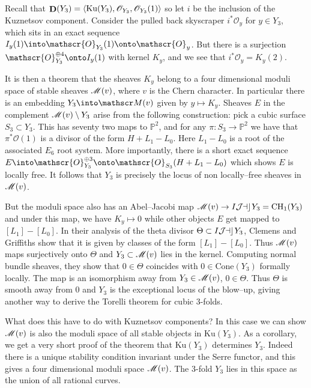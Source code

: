 \begin{example} Recall that \(\mathop{\mathbf{D}}(Y_3)=\langle \text{Ku}(Y_3),
    \mathscr{O}_{Y_3}, \mathscr{O}_{Y_3}(1)\rangle\) so let \(i\) be the
    inclusion of the Kuznetsov component. Consider the pulled back
    skyscraper \(i^\ast\mathscr{O}_y\) for \(y\in Y_3\), which sits in an exact
    sequence \(I_y(1)\into \mathscr{O}_{Y_3}(1)\onto \mathscr{O}_y \). But there
    is a surjection \(\mathscr{O}^{\oplus 4}_{Y_3}\onto
    I_y(1)\) with kernel \(K_y\), and we see that \(i^\ast
    \mathscr{O}_y=K_y(2)\).

    It is then a theorem that the sheaves \(K_y\) belong to a four dimensional
    moduli space of stable sheaves \(\mathscr{M}(v)\), where \(v\) is the Chern
    character. In particular there is an embedding \(Y_3\into \Moduli(v)\)
    given by \(y\mapsto K_y\). Sheaves \(E\) in the complement
    \(\mathscr{M}(v)\setminus Y_3\) arise from the following construction: pick
    a cubic surface \(S_3\subset Y_3\). This has seventy two maps to
    \(\mathbb{P}^2\), and for any \(\pi:S_3\to \mathbb{P}^2\) we have that
    \(\pi^\ast\mathscr{O}(1)\) is a divisor of the form \(H+L_1-L_0\). Here
    \(L_1-L_0\) is a root of the associated \(E_6\) root system. More
    importantly, there is a short exact sequence \(E\into
    \mathscr{O}_{Y_3}^{\oplus 3}\onto \mathscr{O}_{S_3}(H+L_1-L_0)\) which
    shows \(E\) is locally free. It follows that \(Y_3\) is precisely the locus
    of non locally--free sheaves in \(\mathscr{M}(v)\).

    But the moduli space also has an Abel--Jacobi map \(\mathscr{M}(v)\to
    \mathop{I\mathcal{J\kern -0.5pt a\kern -0.5pt c\kern -1pt}} Y_3=\text{CH}_1(Y_3)\) and under this map, we have
    \(K_y\mapsto 0\) while other objects \(E\) get mapped to \([L_1]-[L_0]\).
    In their analysis of the theta divisor \(\Theta\subset \mathop{I\mathcal{J\kern -0.5pt a\kern -0.5pt c\kern -1pt}} Y_3\),
    Clemens and Griffiths show that it is given by classes of the form
    \([L_1]-[L_0]\). Thus \(\mathscr{M} (v)\) maps surjectively onto \(\Theta\)
    and \(Y_3\subset \mathscr{M}(v)\) lies in the kernel. Computing normal bundle
    sheaves, they show that \(0\in \Theta\) coincides with \(0\in
    \text{Cone}(Y_3)\) formally locally. The map is an isomorphism away from
    \(Y_3\in \mathscr{M}(v)\), \(0\in \Theta\). Thus \(\Theta\) is smooth away
    from \(0\) and \(Y_3\) is the exceptional locus of the blow--up, giving
    another way to derive the Torelli theorem for cubic 3-folds.

    What does this have to do with Kuznetsov components? In this case we can
    show \(\mathscr{M}(v)\) is also the moduli space of all stable objects in
    \(\text{Ku}(Y_3)\). As a corollary, we get a very short proof of the theorem
    that \(\text{Ku}(Y_3)\) determines \(Y_3\). Indeed there is a unique
    stability condition invariant under the Serre functor, and this gives a four
    dimensional moduli space \(\mathscr{M}(v)\). The 3-fold \(Y_3\) lies in this
    space as the union of all rational curves.
\end{example}

